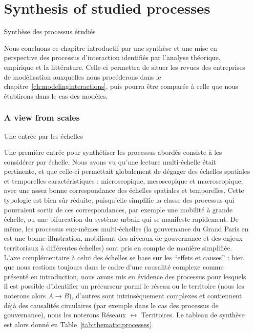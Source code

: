 


\newpage

\section*{Synthesis of studied processes}{Synthèse des processus étudiés}




Nous concluons ce chapitre introductif par une synthèse et une mise en perspective des processus d'interaction identifiés par l'analyse théorique, empirique et la littérature. Celle-ci permettra de situer les revues des entreprises de modélisation auxquelles nous procéderons dans le chapitre~\ref{ch:modelinginteractions}, puis pourra être comparée à celle que nous établirons dans le cas des modèles.


\subsubsection*{A view from scales}{Une entrée par les échelles}

Une première entrée pour synthétiser les processus abordés consiste à les considérer par échelle. Nous avons vu qu'une lecture multi-échelle était pertinente, et que celle-ci permettait globalement de dégager des échelles spatiales et temporelles caractéristiques : microscopique, mesoscopique et macroscopique, avec une assez bonne correspondance des échelles spatiales et temporelles. Cette typologie est bien sûr réduite, puisqu'elle simplifie la classe des processus qui pourraient sortir de ces correspondances, par exemple une mobilité à grande échelle, ou une bifurcation du système urbain qui se manifeste rapidement. De même, les processus eux-mêmes multi-échelles (la gouvernance du Grand Paris en est une bonne illustration, mobilisant des niveaux de gouvernance et des enjeux territoriaux à différentes échelles) sont pris en compte de manière simplifiée. L'axe complémentaire à celui des échelles se base sur les ``effets et causes'' : bien que nous restions toujours dans le cadre d'une causalité complexe comme présenté en introduction, nous avons mis en évidence des processus pour lesquels il est possible d'identifier un précurseur parmi le réseau ou le territoire (nous les noterons alors $A \rightarrow B$), d'autres sont intrinsèquement complexes et contiennent déjà des causalités circulaires (par exemple dans le cas des processus de gouvernance), nous les noterons Réseaux $\leftrightarrow$ Territoires. Le tableau de synthèse est alors donné en Table~\ref{tab:thematic:processes}.


